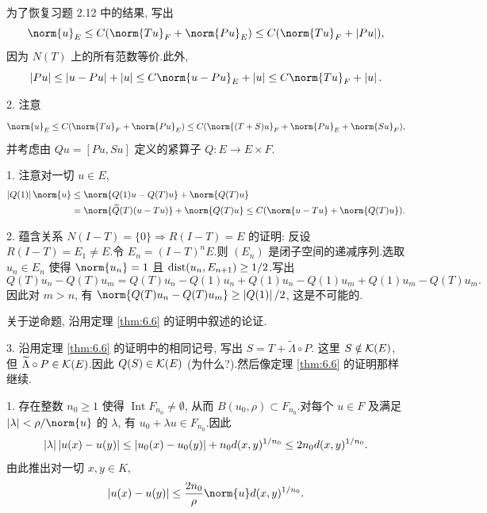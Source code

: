 为了恢复习题 2.12 中的结果, 写出
\begin{equation*}
\norm{u}_E\le C(\norm{Tu}_F+\norm{Pu}_E)\le C(\norm{Tu}_F+\abs{Pu}),
\end{equation*}
因为 $N(T)$ 上的所有范数等价.此外,
\begin{equation*}
\abs{Pu}\le\abs{u-Pu}+\abs{u}\le C\norm{u-Pu}_E+\abs{u}\le C\norm{Tu}_F+\abs{u}.
\end{equation*}

2. 注意
\begin{equation*}
\norm{u}_E\le C(\norm{Tu}_F+\norm{Pu}_E)\le C(\norm{(T+S)u}_F+\norm{Pu}_E+\norm{Su}_F),
\end{equation*}
并考虑由 $Qu=[Pu,Su]$ 定义的紧算子 $Q:E\to E\times F$.


1. 注意对一切 $u\in E$,
\begin{align*}
\abs{Q(1)}\norm{u}&\le\norm{Q(1)u-Q(T)u}+\norm{Q(T)u}\\
&=\norm{\widetilde Q(T)(u-Tu)}+\norm{Q(T)u}\le C(\norm{u-Tu}+\norm{Q(T)u}).
\end{align*}

2. 蕴含关系 $N(I-T)=\{0\}\Rightarrow R(I-T)=E$ 的证明: 反设
$R(I-T)=E_1\ne E$.令 $E_n=(I-T)^nE$.则 $(E_n)$ 是闭子空间的递减序列.选取
$u_n\in E_n$ 使得 $\norm{u_n}=1$ 且 $\operatorname{dist}(u_n,E_{n+1})\ge1/2$.写出
\begin{equation*}
Q(T)u_n-Q(T)u_m=Q(T)u_n-Q(1)u_n+Q(1)u_n-Q(1)u_m+Q(1)u_m-Q(T)u_m.
\end{equation*}
因此对 $m>n$, 有 $\norm{Q(T)u_n-Q(T)u_m}\ge\abs{Q(1)}/2$, 这是不可能的.

关于逆命题, 沿用定理  \ref{thm:6.6} 的证明中叙述的论证.

3. 沿用定理  \ref{thm:6.6} 的证明中的相同记号, 写出 $S=T+\widetilde\Lambda\circ P$.
这里 $S\notin\mathcal{K}(E)$, 但 $\widetilde\Lambda\circ P\in\mathcal{K}(E)$.因此
$Q(S)\in\mathcal{K}(E)$ (为什么?).然后像定理  \ref{thm:6.6} 的证明那样继续.


1. 存在整数 $n_0\ge1$ 使得 $\operatorname{Int}F_{n_0}\ne\emptyset$, 从而
$B(u_0,\rho)\subset F_{n_0}$.对每个 $u\in F$ 及满足 $\abs{\lambda}<\rho/\norm{u}$
的 $\lambda$, 有 $u_0+\lambda u\in F_{n_0}$.因此
\begin{equation*}
\left|\lambda\right|\left|u(x)-u(y)\right|\le\left|u_0(x)-u_0(y)\right|+n_0d(x,y)^{1/n_0}
\le2n_0d(x,y)^{1/n_0}.
\end{equation*}
由此推出对一切 $x,y\in K$,
\begin{equation*}
\abs{u(x)-u(y)}\le\frac{2n_0}{\rho}\norm{u}d(x,y)^{1/n_0}.
\end{equation*}

